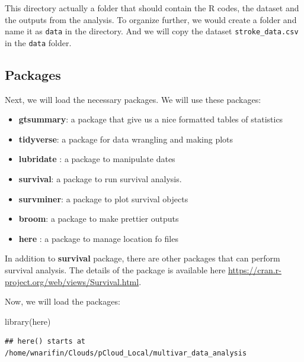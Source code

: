 \documentclass[
  10pt,
]{krantz}
\newenvironment{Shaded}{\begin{snugshade}}{\end{snugshade}}
\newcommand{\FunctionTok}[1]{\textcolor[rgb]{0.00,0.00,0.00}{#1}}
\newcommand{\NormalTok}[1]{#1}
\providecommand{\tightlist}{%
  \setlength{\itemsep}{0pt}\setlength{\parskip}{0pt}}
\begin{document}
This directory actually a folder that should contain the R codes, the dataset and the outputs from the analysis. To organize further, we would create a folder and name it as \texttt{data} in the directory. And we will copy the dataset \texttt{stroke\_data.csv} in the \texttt{data} folder.

\hypertarget{packages-1}{%
\subsection{Packages}\label{packages-1}}

Next, we will load the necessary packages. We will use these packages:

\begin{itemize}
\tightlist
\item
  \textbf{gtsummary}: a package that give us a nice formatted tables of statistics
\item
  \textbf{tidyverse}: a package for data wrangling and making plots
\item
  \textbf{lubridate} : a package to manipulate dates
\item
  \textbf{survival}: a package to run survival analysis.
\item
  \textbf{survminer}: a package to plot survival objects
\item
  \textbf{broom}: a package to make prettier outputs
\item
  \textbf{here} : a package to manage location fo files
\end{itemize}

In addition to \textbf{survival} package, there are other packages that can perform survival analysis. The details of the package is available here \url{https://cran.r-project.org/web/views/Survival.html}.

Now, we will load the packages:

\begin{Shaded}
\begin{Highlighting}[]
\FunctionTok{library}\NormalTok{(here)}
\end{Highlighting}
\end{Shaded}

\begin{verbatim}
## here() starts at /home/wnarifin/Clouds/pCloud_Local/multivar_data_analysis
\end{verbatim}
\end{document}
